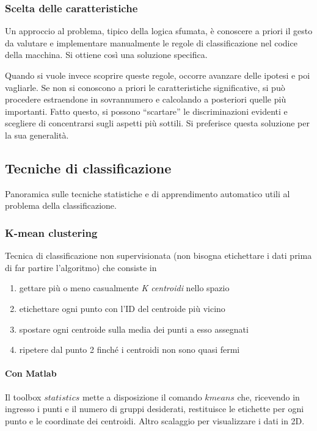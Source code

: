 \subsubsection{Scelta delle caratteristiche}
\label{sssez:scelta}

Un approccio al problema, tipico della logica sfumata,
\`e conoscere a priori il gesto da valutare e
implementare manualmente le regole di classificazione nel codice della macchina.
Si ottiene così una soluzione specifica.

Quando si vuole invece scoprire queste regole,
occorre avanzare delle ipotesi e poi vagliarle.
Se non si conoscono a priori le caratteristiche significative,
si può procedere estraendone in sovrannumero e
calcolando a posteriori quelle più importanti.
Fatto questo, si possono ``scartare'' le discriminazioni evidenti
e scegliere di concentrarsi sugli aspetti più sottili.
Si preferisce questa soluzione per la sua generalità.






\subsection{Tecniche di classificazione}
Panoramica sulle tecniche statistiche e di apprendimento automatico utili al problema della classificazione.

\subsubsection{K-mean clustering}
Tecnica di classificazione non supervisionata
(non bisogna etichettare i dati prima di far partire l'algoritmo)
che consiste in
\begin{enumerate}
  \item{gettare pi\`u o meno casualmente \emph{K centroidi} nello spazio}
  \item{etichettare ogni punto con l'ID del centroide pi\`u vicino}
  \item{spostare ogni centroide sulla media dei punti a esso assegnati}
  \item{ripetere dal punto 2 finch\'e i centroidi non sono quasi fermi}
\end{enumerate}

\paragraph{Con Matlab}
Il toolbox $statistics$ mette a disposizione il comando $kmeans$ che,
ricevendo in ingresso i punti e il numero di gruppi desiderati,
restituisce le etichette per ogni punto e le coordinate dei centroidi.
Altro scalaggio per visualizzare i dati in 2D.


